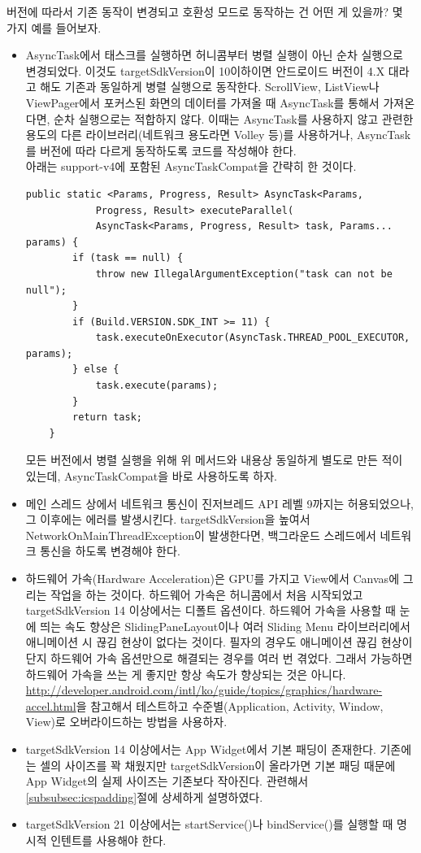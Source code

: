 버전에 따라서 기존 동작이 변경되고 호환성 모드로 동작하는 건 어떤 게 있을까? 몇 가지 예를 들어보자.
\begin{itemize}
\item AsyncTask에서 태스크를 실행하면 허니콤부터 병렬 실행이 아닌 순차 실행으로 변경되었다. 
이것도 targetSdkVersion이 10이하이면 안드로이드 버전이 4.X 대라고 해도 기존과 동일하게 병렬 실행으로 동작한다. 
ScrollView, ListView나  ViewPager에서 포커스된 화면의 데이터를 가져올 때 AsyncTask를 통해서 가져온다면, 순차 실행으로는 적합하지 않다. 
이때는  AsyncTask를 사용하지 않고 관련한 용도의 다른 라이브러리(네트워크 용도라면 Volley 등)를 사용하거나, AsyncTask를 버전에 따라 다르게 동작하도록 코드를 작성해야 한다.\\

아래는 support-v4에 포함된 AsyncTaskCompat을 간략히 한 것이다.
\begin{lstlisting}[frame=single]
	public static <Params, Progress, Result> AsyncTask<Params,
			Progress, Result> executeParallel(
            AsyncTask<Params, Progress, Result> task, Params... params) {
        if (task == null) {
            throw new IllegalArgumentException("task can not be null");
        }
        if (Build.VERSION.SDK_INT >= 11) {
            task.executeOnExecutor(AsyncTask.THREAD_POOL_EXECUTOR, params);
        } else {
            task.execute(params);
        }
        return task;
    }
\end{lstlisting}
모든 버전에서 병렬 실행을 위해 위 메서드와 내용상 동일하게 별도로 만든 적이 있는데, AsyncTaskCompat을 바로 사용하도록 하자.

\item 메인 스레드 상에서 네트워크 통신이 진저브레드 API 레벨 9까지는 허용되었으나, 그 이후에는 에러를 발생시킨다. 
targetSdkVersion을 높여서 NetworkOnMainThreadException이 발생한다면, 백그라운드 스레드에서 네트워크 통신을 하도록 변경해야 한다.

\item 하드웨어 가속(Hardware Acceleration)은 GPU를 가지고 View에서 Canvas에 그리는 작업을 하는 것이다. 
하드웨어 가속은 허니콤에서 처음 시작되었고 targetSdkVersion 14 이상에서는 디폴트 옵션이다. 
하드웨어 가속을 사용할 때 눈에 띄는 속도 향상은 SlidingPaneLayout이나 여러 Sliding Menu 라이브러리에서 애니메이션 시 끊김 현상이 없다는 것이다. 
필자의 경우도 애니메이션 끊김 현상이 단지 하드웨어 가속 옵션만으로 해결되는 경우를 여러 번 겪었다.
그래서 가능하면 하드웨어 가속을 쓰는 게 좋지만 항상 속도가 향상되는 것은 아니다. 
\url{http://developer.android.com/intl/ko/guide/topics/graphics/hardware-accel.html}을 참고해서 테스트하고 수준별(Application, Activity, Window, View)로 오버라이드하는 방법을 사용하자.

\item targetSdkVersion 14 이상에서는 App Widget에서 기본 패딩이 존재한다. 
기존에는 셀의 사이즈를 꽉 채웠지만 targetSdkVersion이 올라가면 기본 패딩 때문에 App Widget의 실제 사이즈는 기존보다 작아진다. 
관련해서 \ref{subsubsec:icspadding}절에 상세하게 설명하였다.

\item targetSdkVersion 21 이상에서는 startService()나 bindService()를 실행할 때 명시적 인텐트를 사용해야 한다.
\end{itemize}

